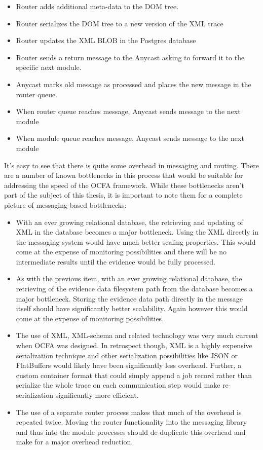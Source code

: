 \begin{itemize}
\item Router adds additional meta-data to the DOM tree.
\item Router serializes the DOM tree to a new version of the XML trace
\item Router updates the XML BLOB in the Postgres database
\item Router sends a return message to the Anycast asking to forward it to the specific next module.
\item Anycast marks old message as processed and places the new message in the router queue.
\item When router queue reaches message, Anycast sends message to the next module
\item When module queue reaches message, Anycast sends message to the next module
\end{itemize}
It's easy to see that there is quite some overhead in messaging and routing.
There are a number of known bottlenecks in this process that would be suitable for addressing the speed of the OCFA framework. While these bottlenecks aren't part of the subject of this thesis, it is important to note them for a complete picture of messaging based bottlenecks:
\begin{itemize}
\item With an ever growing relational database, the retrieving and updating of XML in the database becomes a major bottleneck. Using the XML directly in the messaging system would have much better scaling properties. This would come at the expense of monitoring possibilities and there will be no intermediate results until the evidence would be fully processed. 
\item As with the previous item, with an ever growing relational database, the retrieving of the evidence data filesystem path from the database becomes a major bottleneck. Storing the evidence data path directly in the message itself should have significantly better scalability. Again however this would come at the expense of monitoring possibilities.
\item The use of XML, XML-schema and related technology was very much current when OCFA was designed. In retrospect though, XML is a highly expensive serialization technique and other serialization possibilities like JSON or FlatBuffers
would likely have been significantly less overhead. Further, a custom container format that could simply append a job record rather than serialize the whole trace on each communication step would make re-serialization significantly more efficient.
\item The use of a separate router process makes that much of the overhead is repeated twice. Moving the router functionality into the messaging library and thus into the module processes should de-duplicate this overhead and make for a major overhead reduction. 
\end{itemize}
